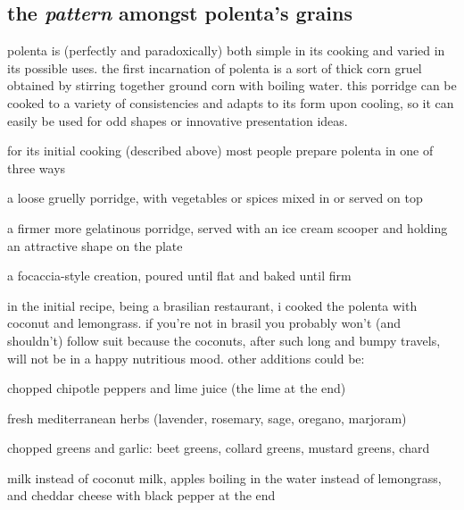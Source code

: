\subsection{the \textit{pattern} amongst polenta's grains}

polenta is (perfectly and paradoxically) both simple in its cooking and varied 
in its possible uses. the first incarnation of polenta is a sort of thick corn 
gruel obtained by stirring together ground corn with boiling water. this 
porridge can be cooked to a variety of consistencies and adapts to its form 
upon cooling, so it can easily be used for odd shapes or innovative 
presentation ideas.

for its initial cooking (described above) most people prepare polenta in one 
of three ways

\begin{ingredients}

  \item a loose gruelly porridge, with vegetables or spices mixed in or 
  served on top
  
  \item a firmer more gelatinous porridge, served with an ice cream scooper 
  and holding an attractive shape on the plate
  
  \item a focaccia-style creation, poured until flat and baked until firm

\end{ingredients}

in the initial recipe, being a brasilian restaurant, i cooked the polenta 
with coconut and lemongrass. if you're not in brasil you probably won't 
(and shouldn't) follow suit because the coconuts, after such long and bumpy 
travels, will not be in a happy nutritious mood. other additions could be:

\begin{ingredients}

  \item chopped chipotle peppers and lime juice (the lime at the end)

  \item fresh mediterranean herbs (lavender, rosemary, sage, oregano, marjoram)

  \item chopped greens and garlic: beet greens, collard greens, mustard 
  greens, chard

  \item milk instead of coconut milk, apples boiling in the water instead of 
  lemongrass, and cheddar cheese with black pepper at the end

\end{ingredients}

